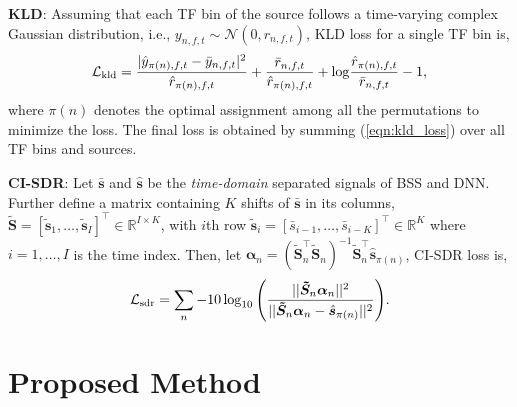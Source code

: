 \documentclass[a4paper]{article}
\begin{document}
\noindent
\textbf{KLD}:
Assuming that each TF bin of the source follows a time-varying complex Gaussian distribution, 
i.e., $y_{n,f,t} \sim \mathcal{N}(0, r_{n,f,t})$,
KLD loss for a single TF bin is, 
\begin{gather}
  \label{eqn:kld_loss}
    \mathcal{L}_{\rm{kld}} =  \frac{|\hat{y}_{\pi(n),f,t}-\bar{y}_{n,f,t}|^2}{\hat{r}_{\pi(n),f,t}} + \frac{\bar{r}_{n,f,t}}{\hat{r}_{\pi(n),f,t}} + \mathrm{log}\frac{\hat{r}_{\pi(n),f,t}}{\bar{r}_{n,f,t}}  - 1,
\end{gather}
where $\pi(n)$ denotes the optimal assignment among all the permutations to minimize the loss. 
The final loss is obtained by summing (\ref{eqn:kld_loss}) over all TF bins and sources.

\noindent
\textbf{CI-SDR}:
Let $\bm{\bar{s}}$ and $\bm{\hat{s}}$ be the \textit{time-domain} separated signals of BSS and DNN.
Further define a matrix containing $K$ shifts of $\bm{\bar{s}}$ in its columns, $\bm{\tilde{S}}=[\bm{\tilde{s}}_{1},\dots,\bm{\tilde{s}}_{I}]^\top{}\in\mathbb{R}^{{I}\times{K}}$, with $i$th row $\bm{\tilde{s}}_{i}=[\bar{s}_{i-1},\dots,\bar{s}_{i-K}]^\top{} \in\mathbb{R}^{K}$ where $i=1,\dots,I$ is the time index.
Then, let $\bm{\alpha}_{n}=(\bm{\tilde{S}}_{n}^\top{}\bm{\tilde{S}}_{n})^{-1}\bm{\tilde{S}}_{n}^\top{}\bm{\hat{s}}_{\pi(n)}$, CI-SDR loss is,
\begin{align}
  \label{eqn:cisdr}
    \mathcal{L}_{\rm{sdr}} = \sum_{n} -10\log_{10}{\left(\frac{||\bm{\tilde{S}}_{n}\bm{\alpha}_{n}||^2}{||\bm{\tilde{S}}_{n}\bm{\alpha}_{n}-\hat{\bm{s}}_{\pi(n)}||^2}\right)}.
\end{align}



\section{Proposed Method}
\label{sec:prop}
\end{document}
